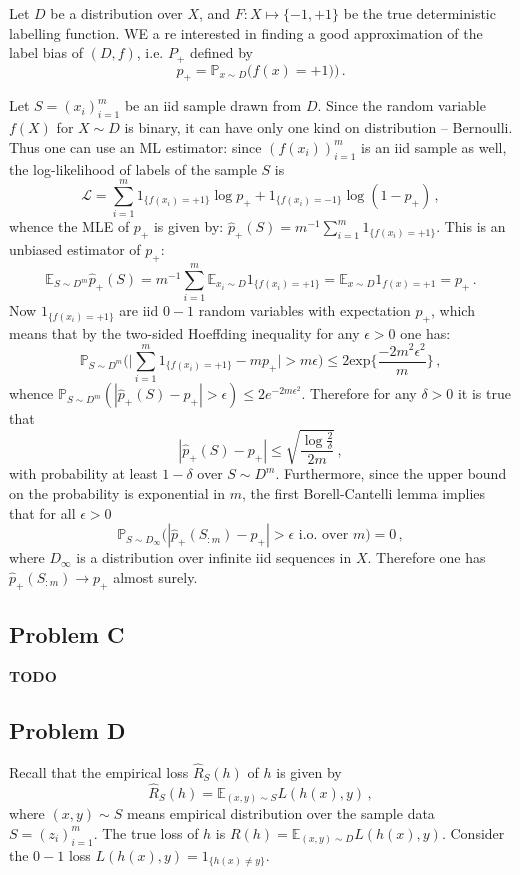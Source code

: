\documentclass[a4paper]{article}
\newcommand{\ex}{\mathbb{E}}
\newcommand{\pr}{\mathbb{P}}
\begin{document}
Let $D$ be a distribution over $X$, and $F:X\mapsto\{-1,+1\}$ be the true deterministic
labelling function. WE a re interested in finding a good approximation of the label
bias of $(D, f)$, i.e. $P_+$ defined by
\[ p_+ = \pr_{x\sim D}\bigl(f(x) = +1)\bigr) \,. \]

Let $S=(x_i)_{i=1}^m$ be an iid sample drawn from $D$. Since the random variable
$f(X)$ for $X\sim D$ is binary, it can have only one kind on distribution -- Bernoulli.
Thus one can use an ML estimator: since $(f(x_i))_{i=1}^m$ is an iid sample as well,
the log-likelihood of labels of the sample $S$ is
\[ \mathcal{L} = \sum_{i=1}^m 1_{\{f(x_i)=+1\}} \log p_+ + 1_{\{f(x_i)=-1\}} \log(1-p_+) \,, \]
whence the MLE of $p_+$ is given by: $\hat{p}_+(S) = m^{-1} \sum_{i=1}^m 1_{\{f(x_i)=+1\}}$.
This is an unbiased estimator of $p_+$:
\[ \ex_{S\sim D^m} \hat{p}_+(S)
  = m^{-1} \sum_{i=1}^m \ex_{x_i\sim D} 1_{\{f(x_i)=+1\}} 
  = \ex_{x\sim D} 1_{f(x)=+1} = p_+ \,. \]
Now $1_{\{f(x_i)=+1\}}$ are iid $0-1$ random variables with expectation $p_+$, which
means that by the two-sided Hoeffding inequality for any $\epsilon>0$ one has:
\[ \pr_{S\sim D^m}\bigl(
    \bigl| \sum_{i=1}^m 1_{\{f(x_i)=+1\}} - m p_+ \bigr| > m\epsilon
  \bigr) \leq 2 \text{exp}\biggl\{\frac{-2m^2\epsilon^2}{m}\biggr\}
  \,, \]
whence $\pr_{S\sim D^m}( |\hat{p}_+(S) - p_+| > \epsilon ) \leq 2 e^{-2m\epsilon^2}$.
Therefore for any $\delta>0$ it is true that
\[ |\hat{p}_+(S) - p_+| \leq \sqrt{\frac{\log\frac{2}{\delta}}{2m}} \,, \]
with probability at least $1-\delta$ over $S\sim D^m$.
Furthermore, since the upper bound on the probability is exponential in $m$,
the first Borell-Cantelli lemma implies that for all $\epsilon>0$
\[ \pr_{S\sim D_\infty} \bigl(
  |\hat{p}_+(S_{:m}) - p_+| > \epsilon
    \text{ i.o. over } m \bigr) = 0 \,, \]
where $D_\infty$ is a distribution over infinite iid sequences in $X$. Therefore
one has $\hat{p}_+(S_{:m}) \to p_+$ almost surely.


\subsection{Problem C} %
\label{sub:problem_c}

\textbf{TODO}


\subsection{Problem D} %
\label{sub:problem_d}
Recall that the empirical loss $\hat{R}_S(h)$ of $h$ is given by
\[ \hat{R}_S(h) = \ex_{(x,y)\sim S} L(h(x), y) \,, \]
where $(x,y)\sim S$ means empirical distribution over the sample data $S=(z_i)_{i=1}^m$.
The true loss of $h$ is $R(h) = \ex_{(x,y)\sim D} L(h(x), y)$. Consider the $0-1$
loss $L(h(x), y) = 1_{\{h(x)\neq y\}}$.
\end{document}
